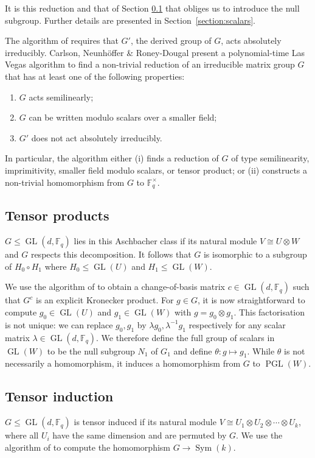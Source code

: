 \documentclass[12pt,twoside,reqno,psamsfonts]{amsproc}
\newcommand{\nullsubgp}{{null subgroup}\xspace}
\numberwithin{equation}{section}
\numberwithin{figure}{section}
\newcounter{algorithm}
\theoremstyle{plain}
\theoremstyle{definition}
\theoremstyle{remark}
\providecommand{\Sym}[1]{\operatorname{Sym}( #1 )}
\newcommand{\field}[1]{\mathbb{#1}}
\newcommand{\F}{\field{F}}
\DeclareMathOperator{\GL}{GL}
\DeclareMathOperator{\PGL}{PGL}
\begin{document}
It is this reduction and that 
of Section \ref{tensor-product} that obliges us to introduce the \nullsubgp. 
Further details are presented in Section~\ref{section:scalars}.

The algorithm of \cite{smallerfield} requires that 
$G'$, the derived group of $G$, acts absolutely irreducibly.
Carlson, Neunh\"offer \& Roney-Dougal \cite{CNRD}
present a polynomial-time Las Vegas algorithm to
find a non-trivial reduction of an irreducible matrix group $G$ that
has at least one of the following properties: 
\begin{enumerate}
\item $G$ acts semilinearly;
\item $G$ can be written modulo scalars over a smaller field;
\item $G'$ does not act absolutely irreducibly. 
\end{enumerate}
In particular, the algorithm either (i) finds a reduction of $G$
of type semilinearity, imprimitivity, smaller field modulo scalars, or
tensor product; or (ii) constructs a non-trivial homomorphism from
$G$ to $\F_q^\times$.

\subsection{Tensor products}
\label{tensor-product}
$G \leqslant \GL(d, \F_q)$ lies in this Aschbacher class if
its natural module %
$V \cong U \otimes W$ and $G$ respects this decomposition. It
follows that $G$ is isomorphic to a subgroup of
$H_0 \circ H_1$ where $H_0 \leqslant \GL(U)$ and $H_1 \leqslant \GL(W)$. 

We use the algorithm of \cite{tensorprodalg} to obtain a 
change-of-basis matrix
$c \in \GL(d, \F_q)$ such that $G^c$ is an explicit Kronecker product.
For $g \in G$, it is now straightforward to compute 
$g_0 \in \GL(U)$ and $g_1 \in \GL(W)$ with $g=g_0 \otimes g_1$. 
This factorisation is not unique: %
we can replace
$g_0, g_1$ by $\lambda g_0,\lambda^{-1} g_1$ respectively
for any scalar matrix $\lambda \in \GL(d, \F_q)$.
We therefore define the full group of scalars in $\GL(W)$ to be the \nullsubgp
$N_1$ of $G_1$ and define $\theta:g \mapsto g_1$. 
While $\theta$ is not necessarily a
homomorphism, it induces a homomorphism from $G$ to $\PGL(W)$. 

\subsection{Tensor induction}
$G \leqslant \GL(d, \F_q)$ is tensor induced if its
natural module %
$V \cong U_1 \otimes U_2 \otimes \dotsm \otimes U_k$, where all $U_i$ have the
same dimension and are permuted by $G$. 
We use the algorithm of \cite{MR1925006} to compute the homomorphism
$G \to \Sym{k}$.
\end{document}
